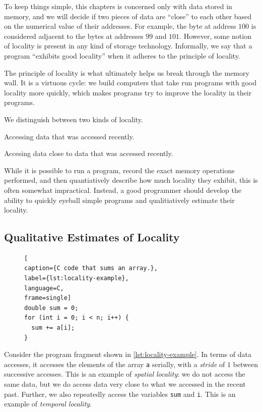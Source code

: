 To keep things simple, this chapters is concerned only with data
stored in memory, and we will decide if two pieces of data are
``close'' to each other based on the numerical value of their
addresses.  For example, the byte at address $100$ is considered
adjacent to the bytes at addresses $99$ and $101$.  However, some
notion of locality is present in any kind of storage technology.
Informally, we say that a program ``exhibits good locality'' when it
adheres to the principle of locality.

The principle of locality is what ultimately helps us break through
the memory wall.  It is a virtuous cycle: we build computers that take
run programs with good locality more quickly, which makes programs try
to improve the locality in their programs.

We distinguish between two kinds of locality.

\begin{definition}
  Accessing data that was accessed recently.
\end{definition}

\begin{definition}
  Accesing data close to data that was accessed recently.
\end{definition}

While it is possible to run a program, record the exact memory
operations performed, and then quantiatively describe how much
locality they exhibit, this is often somewhat impractical.  Instead, a
good programmer should develop the ability to quickly eyeball simple
programs and qualitiatively estimate their locality.

\subsection{Qualitative Estimates of Locality}

\begin{figure}
\begin{lstlisting}[
caption={C code that sums an array.},
label={lst:locality-example},
language=C,
frame=single]
double sum = 0;
for (int i = 0; i < n; i++) {
  sum += a[i];
}
\end{lstlisting}
\end{figure}

Consider the program fragment shown in \cref{lst:locality-example}.
In terms of data accesses, it accesses the elements of the array
\texttt{a} serially, with a \emph{stride} of $1$ between successive
accesses.  This is an example of \emph{spatial locality}: we do not
access the same data, but we do access data very close to what we
accessed in the recent past.  Further, we also repeatedly access the
variables \texttt{sum} and \texttt{i}. This is an example of
\emph{temporal locality}.

